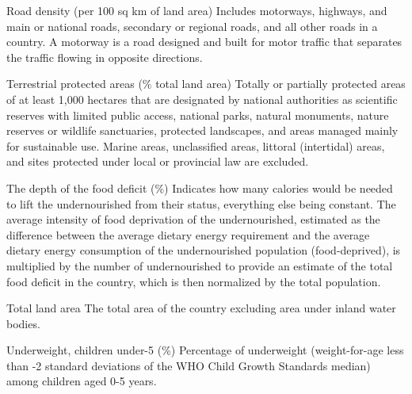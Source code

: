 \begin{MetadataCollection} {}
\begin{metadata}{Road density (per 100 sq km of land area)} {}
Includes motorways, highways, and main or national roads, secondary or regional roads, and all other roads in a country. A motorway is a road designed and built for motor traffic that separates the traffic flowing in opposite directions.
\end{metadata}

\begin{metadata}{Terrestrial protected areas (\% total land area)} {}
Totally or partially protected areas of at least 1,000 hectares that are designated by national authorities as scientific reserves with limited public access, national parks, natural monuments, nature reserves or wildlife sanctuaries, protected landscapes, and areas managed mainly for sustainable use. Marine areas, unclassified areas, littoral (intertidal) areas, and sites protected under local or provincial law are excluded.
\end{metadata}

\begin{metadata}{The depth of the food deficit (\%)} {}
Indicates how many calories would be needed to lift the undernourished from their status, everything else being constant. The average intensity of food deprivation of the undernourished, estimated as the difference between the average dietary energy requirement and the average dietary energy consumption of the undernourished population (food-deprived), is multiplied by the number of undernourished to provide an estimate of the total food deficit in the country, which is then normalized by the total population.
\end{metadata}

\begin{metadata}{Total land area} {}
The total area of the country excluding area under inland water bodies.
\end{metadata}

\begin{metadata}{Underweight, children under-5 (\%)} {}
Percentage of underweight (weight-for-age less than -2 standard deviations of the WHO Child Growth Standards median) among children aged 0-5 years.
\end{metadata}


\end{MetadataCollection}

